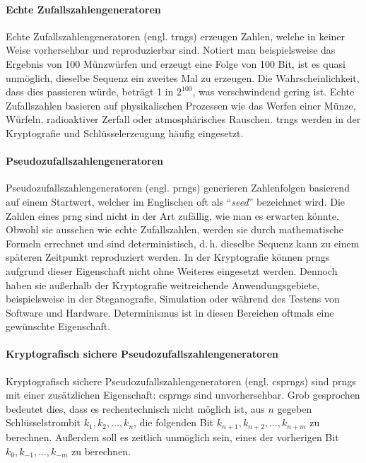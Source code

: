\paragraph{Echte Zufallszahlengeneratoren}
Echte Zufallszahlengeneratoren (engl. \acp{trng})
erzeugen Zahlen, welche in keiner Weise vorhersehbar und reproduzierbar sind. Notiert man
beispielsweise das Ergebnis von 100 Münzwürfen und erzeugt eine Folge von 100 Bit, ist es quasi
unmöglich, dieselbe Sequenz ein zweites Mal zu erzeugen. Die Wahrscheinlichkeit,
dass dies passieren würde, beträgt 1 in $2^{100}$, was verschwindend gering ist.
Echte Zufallszahlen basieren auf physikalischen Prozessen wie das Werfen einer Münze, Würfeln,
radioaktiver Zerfall oder atmosphärisches Rauschen. \acp{trng} werden in der Kryptografie und
Schlüsselerzeugung häufig eingesetzt.

\paragraph{Pseudozufallszahlengeneratoren}
Pseudozufallszahlengeneratoren (engl. \acp{prng})
generieren Zahlenfolgen basierend auf einem Startwert, welcher im Englischen oft als
\enquote{\textit{seed}} bezeichnet wird. Die Zahlen eines \ac{prng} sind nicht
in der Art zufällig, wie man es erwarten könnte.
Obwohl sie aussehen wie echte Zufallszahlen, werden sie durch
mathematische Formeln errechnet und sind deterministisch, d.\,h. dieselbe Sequenz
kann zu einem späteren Zeitpunkt reproduziert werden.
In der Kryptografie können \acp{prng} aufgrund dieser Eigenschaft
nicht ohne Weiteres eingesetzt werden.
Dennoch haben sie außerhalb der Kryptografie weitreichende Anwendungsgebiete,
beispielsweise in der Steganografie, Simulation oder während des Testens von Software und Hardware.
Determinismus ist in diesen Bereichen oftmals eine gewünschte Eigenschaft.

\paragraph{Kryptografisch sichere Pseudozufallszahlengeneratoren}
Kryptografisch sichere Pseudozufallszahlengeneratoren
(engl. \acp{csprng}) sind \acp{prng} mit
einer zusätzlichen Eigenschaft: \acp{csprng} sind unvorhersehbar. Grob gesprochen
bedeutet dies, dass es rechentechnisch nicht möglich ist, aus $n$ gegeben Schlüsselstrombit
$k_1,k_2,\dots,k_n$, die folgenden Bit $k_{n+1},k_{n+2},\dots,k_{n+m}$ zu berechnen. Außerdem
soll es zeitlich unmöglich sein, eines der vorherigen Bit
$k_{0},k_{-1},\allowbreak\dots,k_{-m}$ zu berechnen.

